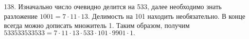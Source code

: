 138. Изначально число очевидно делится на 533, далее необходимо знать разложение $1001=7\cdot11\cdot13.$ Делимость на 101 находить необязательно. В конце всегда можно дописать множитель 1. Таким образом, получим $533533533533=7\cdot11\cdot13\cdot533\cdot101\cdot9901\cdot1.$\\
